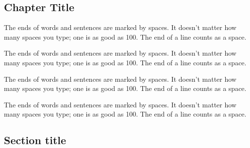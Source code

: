 \cleardoublepage

\begin{frontmatter}
\chapter[Chapter Title]{Chapter Title\footnotemark}
\label{chap2}

\begin{aug}
\author[addressrefs={ad1,ad2}]%
  {   }%
\author[addressrefs={ad2}]%
 { }%
\address[id=ad1]%
  {Short Address}%
\address[id=ad2]%
  {Long Address}%
\end{aug}



%
\begin{chapterpoints}%
\item The ends of words and sentences are marked by spaces. It doesn't
  matter how many spaces you type; one is as good as 100.  The end of
  a line counts as a space.

\item The ends of words and sentences are marked by spaces. It doesn't
  matter how many spaces you type; one is as good as 100.  The end of
  a line counts as a space.
\end{chapterpoints}

\begin{dispquote}

  The ends of words and sentences are marked by spaces. It doesn't
  matter how many spaces you type; one is as good as 100.  The end of
  a line counts as a space.

  The ends of words and sentences are marked by spaces. It doesn't
  matter how many spaces you type; one is as good as 100.  The end of
  a line counts as a space.
  

\end{dispquote}

\end{frontmatter}


\section{Section title}\label{sec2.1}

